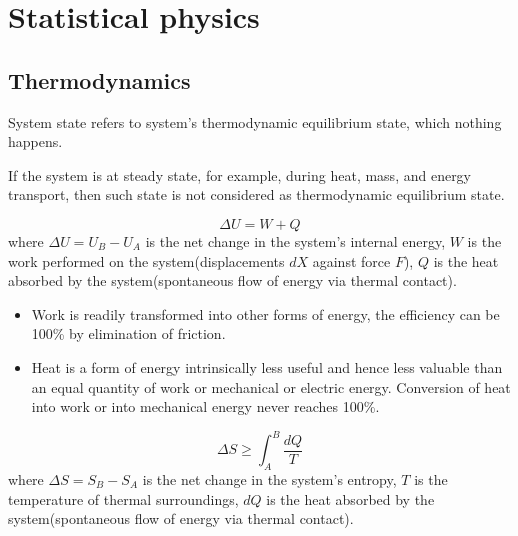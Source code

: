 \chapter{Statistical physics}
\minitoc

\section{Thermodynamics}

\begin{definition}
System state refers to system's thermodynamic equilibrium state, which nothing happens.
\end{definition}

\begin{remark}
If the system is at steady state, for example, during heat, mass, and energy transport, then such state is not considered as thermodynamic equilibrium state.
\end{remark}


\begin{theorem}
	$$\Delta U = W + Q$$
	where $\Delta U = U_B - U_A$ is the net change in the system's internal energy, $W$ is the work performed on the system(displacements $dX$ against force $F$), $Q$ is the heat absorbed by the system(spontaneous flow of energy via thermal contact).
\end{theorem}


\begin{remark}\cite[159]{smith2005introduction} \hfill
	\begin{itemize}
		\item Work is readily transformed into other forms of energy, the efficiency can be 100\% by elimination of friction.
		\item Heat is a form of energy intrinsically less useful and hence less valuable than an equal quantity of work or mechanical or electric energy. Conversion of heat into work or into mechanical energy never reaches 100\%. 
	\end{itemize}
\end{remark}

\begin{theorem}
	$$\Delta S \geq \int_A^B \frac{dQ}{T}$$
	where $\Delta S = S_B - S_A$ is the net change in the system's entropy, $T$ is the temperature of thermal surroundings, $dQ$ is the heat absorbed by the system(spontaneous flow of energy via thermal contact).
\end{theorem}

